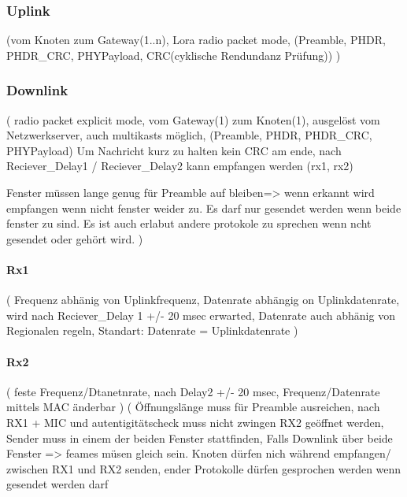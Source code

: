\documentclass[a4paper,12pt]{article}
\begin{document}
            \subsubsection{Uplink}

                \cite{LoRaSpec} 
                    (vom Knoten zum Gateway(1..n), Lora radio packet mode, (Preamble, PHDR, PHDR\_CRC, PHYPayload, CRC(cyklische Rendundanz Prüfung))
                 )

            \subsubsection{Downlink}

                \cite{LoRaSpec}
                (
                    radio packet explicit mode, vom Gateway(1) zum Knoten(1), ausgelöst vom Netzwerkserver, auch multikasts möglich, (Preamble, PHDR, PHDR\_CRC, PHYPayload)
                Um Nachricht kurz zu halten kein CRC am ende, nach Reciever\_Delay1 / Reciever\_Delay2 kann empfangen werden (rx1, rx2) 
                
                Fenster müssen lange genug für Preamble auf bleiben=> wenn erkannt wird empfangen wenn nicht fenster weider zu. Es darf nur gesendet werden wenn beide fenster zu sind.
                Es ist auch erlabut andere protokole zu sprechen wenn ncht gesendet oder gehört wird.
                )
                \paragraph{Rx1}
                    \cite{LoRaSpec}(
                        Frequenz abhänig von Uplinkfrequenz, Datenrate abhängig on Uplinkdatenrate, wird nach Reciever\_Delay 1 +/- 20 msec erwarted, Datenrate auch abhänig von Regionalen regeln, Standart: Datenrate = Uplinkdatenrate
                    )
                \paragraph{Rx2}
                    \cite{LoRaSpec}(
                        feste Frequenz/Dtanetnrate, nach Delay2 +/- 20 msec, Frequenz/Datenrate mittels MAC änderbar
                    )
                    \cite{LoRaSpec}(
                        Öffnungslänge muss für Preamble ausreichen, nach RX1 + MIC und autentigitätscheck muss nicht zwingen RX2 geöffnet werden, Sender muss in einem der beiden Fenster stattfinden, Falls Downlink über beide Fenster => feames müsen gleich sein. Knoten dürfen nich während empfangen/ zwischen RX1 und RX2 senden, ender Protokolle dürfen gesprochen werden wenn gesendet werden darf
\end{document}
